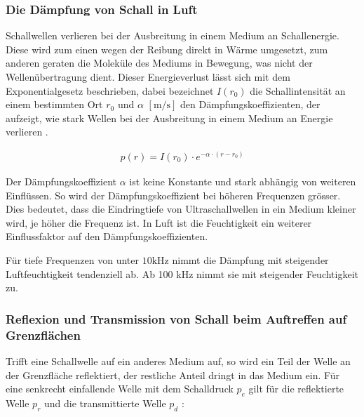 \subsubsection{Die Dämpfung von Schall in Luft}\label{sec:die_daempfung_von_schall_in_luft}
Schallwellen verlieren bei der Ausbreitung in einem Medium an Schallenergie. Diese wird zum einen wegen der Reibung direkt in Wärme umgesetzt, zum anderen geraten die Moleküle des Mediums in Bewegung, was nicht der Wellenübertragung dient. Dieser Energieverlust lässt sich mit dem Exponentialgesetz beschrieben, dabei bezeichnet $I(r_{0})$ die Schallintensität an einem bestimmten Ort $r_{0}$ und $\alpha$ $[\mathrm{m/s}]$ den Dämpfungskoeffizienten, der aufzeigt, wie stark Wellen bei der Ausbreitung in einem Medium an Energie verlieren \cite{HERING}.

\begin{equation}
\begin{gathered}
p(r)=I(r_{0})\cdot e^{-\alpha \cdot(r-r_{0})}
\end{gathered}\label{eq:daempfung}
\end{equation}

Der Dämpfungskoeffizient $\alpha$ ist keine Konstante und stark abhängig von weiteren Einflüssen. So wird der Dämpfungskoeffizient bei höheren Frequenzen  grösser. Dies bedeutet, dass die Eindringtiefe von Ultraschallwellen in ein Medium kleiner wird, je höher die Frequenz ist. In Luft ist die Feuchtigkeit ein weiterer Einflussfaktor auf den Dämpfungskoeffizienten.

Für tiefe Frequenzen von unter $10 \mathrm{kHz}$ nimmt die Dämpfung mit steigender Luftfeuchtigkeit tendenziell ab. Ab 100 kHz nimmt sie mit steigender Feuchtigkeit zu.\cite{KOHLRAUSCH_TABELLEN}

\subsubsection{Reflexion und Transmission von Schall beim Auftreffen auf Grenzflächen}\label{sec:reflexion_und_transmission_von_schall_beim_auftreffen_auf_grenzflaechen}
Trifft eine Schallwelle auf ein anderes Medium auf, so wird ein Teil der Welle an der Grenzfläche reflektiert, der restliche Anteil dringt in das Medium ein. Für eine senkrecht einfallende Welle mit dem Schalldruck $p_{e}$ gilt für die reflektierte Welle $p_{r}$ und die transmittierte Welle $p_{d}$ \cite{KOHLRAUSCH}:

